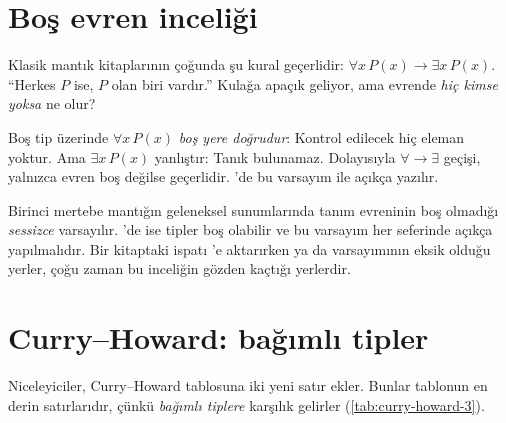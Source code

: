 \section{Boş evren inceliği}\label{sec:bos-evren}

Klasik mantık kitaplarının çoğunda şu kural geçerlidir:
$\forall x\,P(x) \to \exists x\,P(x)$. ``Herkes $P$ ise, $P$ olan biri
vardır.'' Kulağa apaçık geliyor, ama evrende \emph{hiç kimse yoksa}
ne olur?


\noindent Boş tip  üzerinde $\forall x\,P(x)$ \emph{boş yere
doğrudur}: Kontrol edilecek hiç eleman yoktur. Ama $\exists x\,P(x)$
yanlıştır: Tanık bulunamaz. Dolayısıyla $\forall \to \exists$ geçişi,
yalnızca evren boş değilse geçerlidir. \Lean{}'de bu varsayım
\lc{[Inhabited α]} ile açıkça yazılır.

\begin{dikkat}
Birinci mertebe mantığın geleneksel sunumlarında tanım evreninin boş
olmadığı \emph{sessizce} varsayılır. \Lean{}'de ise tipler boş olabilir
ve bu varsayım her seferinde açıkça yapılmalıdır. Bir kitaptaki ispatı
\Lean{}'e aktarırken  ya da  varsayımının
eksik olduğu yerler, çoğu zaman bu inceliğin gözden kaçtığı yerlerdir.
\end{dikkat}

\section{Curry--Howard: bağımlı tipler}\label{sec:curry-howard-3}

Niceleyiciler, Curry--Howard tablosuna iki yeni satır ekler. Bunlar
tablonun en derin satırlarıdır, çünkü \emph{bağımlı tiplere} karşılık
gelirler (\cref{tab:curry-howard-3}).

